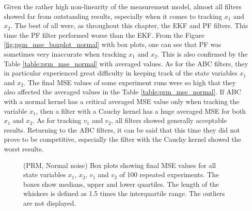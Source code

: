 Given the rather high non-linearity of the measurement model, almost all filters showed far from outstanding results, especially when it comes to tracking \(x_1\) and \(x_2\). The best of all were, as throughout this chapter, the EKF and PF filters. This time the PF filter performed worse than the EKF. From the Figure \ref{fig:pgm_mse_boxplot_normal} with box plots, one can see that PF was sometimes very inaccurate when tracking \(x_1\) and \(x_2\). This is also confirmed by the Table \ref{table:prm_mse_normal} with averaged values. As for the ABC filters, they in particular experienced great difficulty in keeping track of the state variables \(x_1\) and \(x_2\). The final MSE values of some experiment runs were so high that they also affected the averaged values in the Table \ref{table:prm_mse_normal}. If ABC with a normal kernel has a critical averaged MSE value only when tracking the variable \(x_1\), then a filter with a Cauchy kernel has a huge averaged MSE for both \(x_1\) and \(x_2\). As for tracking \(v_1\) and \(v_2\), all filters showed generally acceptable results. Returning to the ABC filters, it can be said that this time they did not prove to be competitive, especially the filter with the Cauchy kernel showed the worst results.

\begin{figure}[!ht]
\centering
\caption{(PRM, Normal noise) Box plots showing final MSE values for all state variables $x_1$, $x_2$, $v_1$ and $v_2$ of 100 repeated experiments. The boxes show medians, upper and lower quartiles. The length of the whiskers is defined as 1.5 times the interquartile range. The outliers are not displayed.}
\label{fig:prm_mse_boxplot_normal}
\end{figure}

